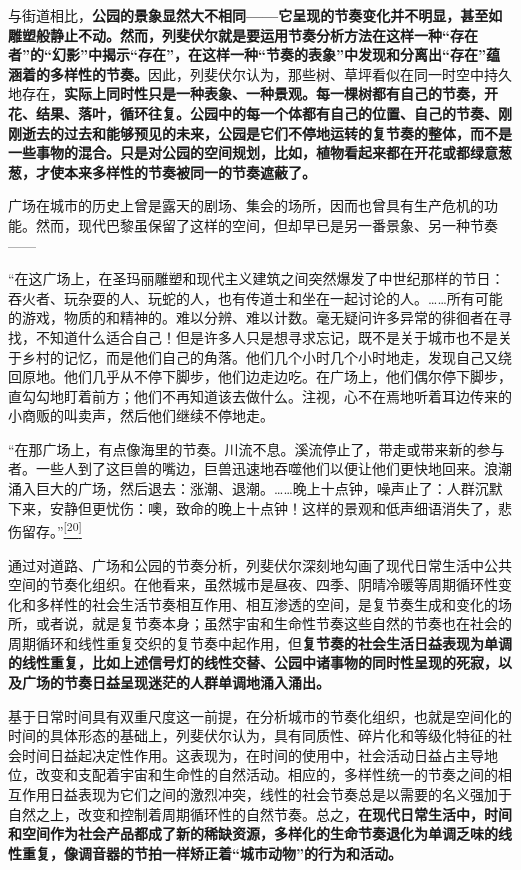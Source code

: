 \documentclass[UTF8, fontset = sourcesans, a4paper, oneside, zihao =
-4, scheme=chinese, no-math, space=true]{ctexbook}
\begin{document}
与街道相比，\textbf{公园的景象显然大不相同------它呈现的节奏变化并不明显，甚至如雕塑般静止不动。然而，列斐伏尔就是要运用节奏分析方法在这样一种``存在者''的``幻影''中揭示``存在''，在这样一种``节奏的表象''中发现和分离出``存在''蕴涵着的多样性的节奏。}因此，列斐伏尔认为，那些树、草坪看似在同一时空中持久地存在，\textbf{实际上同时性只是一种表象、一种景观。每一棵树都有自己的节奏，开花、结果、落叶，循环往复。公园中的每一个体都有自己的位置、自己的节奏、刚刚逝去的过去和能够预见的未来，公园是它们不停地运转的复节奏的整体，而不是一些事物的混合。只是对公园的空间规划，比如，植物看起来都在开花或都绿意葱葱，才使本来多样性的节奏被同一的节奏遮蔽了。}

广场在城市的历史上曾是露天的剧场、集会的场所，因而也曾具有生产危机的功能。然而，现代巴黎虽保留了这样的空间，但却早已是另一番景象、另一种节奏------

``在这广场上，在圣玛丽雕塑和现代主义建筑之间突然爆发了中世纪那样的节日：吞火者、玩杂耍的人、玩蛇的人，也有传道士和坐在一起讨论的人。……所有可能的游戏，物质的和精神的。难以分辨、难以计数。毫无疑问许多异常的徘徊者在寻找，不知道什么适合自己！但是许多人只是想寻求忘记，既不是关于城市也不是关于乡村的记忆，而是他们自己的角落。他们几个小时几个小时地走，发现自己又绕回原地。他们几乎从不停下脚步，他们边走边吃。在广场上，他们偶尔停下脚步，直勾勾地盯着前方；他们不再知道该去做什么。注视，心不在焉地听着耳边传来的小商贩的叫卖声，然后他们继续不停地走。

``在那广场上，有点像海里的节奏。川流不息。溪流停止了，带走或带来新的参与者。一些人到了这巨兽的嘴边，巨兽迅速地吞噬他们以便让他们更快地回来。浪潮涌入巨大的广场，然后退去：涨潮、退潮。……晚上十点钟，噪声止了：人群沉默下来，安静但更忧伤：噢，致命的晚上十点钟！这样的景观和低声细语消失了，悲伤留存。''\protect\hypertarget{part0009_split_002.htmlux5cux23w20}{}{}\protect\hyperlink{part0009_split_004.htmlux5cux23m20}{\textsuperscript{{[}20{]}}}

通过对道路、广场和公园的节奏分析，列斐伏尔深刻地勾画了现代日常生活中公共空间的节奏化组织。在他看来，虽然城市是昼夜、四季、阴晴冷暖等周期循环性变化和多样性的社会生活节奏相互作用、相互渗透的空间，是复节奏生成和变化的场所，或者说，就是复节奏本身；虽然宇宙和生命性节奏这些自然的节奏也在社会的周期循环和线性重复交织的复节奏中起作用，但\textbf{复节奏的社会生活日益表现为单调的线性重复，比如上述信号灯的线性交替、公园中诸事物的同时性呈现的死寂，以及广场的节奏日益呈现迷茫的人群单调地涌入涌出。}

基于日常时间具有双重尺度这一前提，在分析城市的节奏化组织，也就是空间化的时间的具体形态的基础上，列斐伏尔认为，具有同质性、碎片化和等级化特征的社会时间日益起决定性作用。这表现为，在时间的使用中，社会活动日益占主导地位，改变和支配着宇宙和生命性的自然活动。相应的，多样性统一的节奏之间的相互作用日益表现为它们之间的激烈冲突，线性的社会节奏总是以需要的名义强加于自然之上，改变和控制着周期循环性的自然节奏。总之，\textbf{在现代日常生活中，时间和空间作为社会产品都成了新的稀缺资源，多样化的生命节奏退化为单调乏味的线性重复，像调音器的节拍一样矫正着``城市动物''的行为和活动。}
\end{document}
